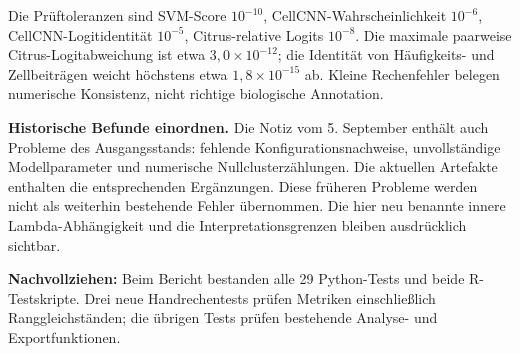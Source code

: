 \documentclass[11pt,a4paper]{article}
\newcommand{\source}[1]{\par{\footnotesize\raggedright\color{muted}\textbf{Nachvollziehen:} #1\par}}
\begin{document}
Die Prüftoleranzen sind SVM-Score \(10^{-10}\), CellCNN-Wahrscheinlichkeit
\(10^{-6}\), CellCNN-Logitidentität \(10^{-5}\), Citrus-relative Logits
\(10^{-8}\). Die maximale paarweise Citrus-Logitabweichung ist etwa
\(3{,}0\times10^{-12}\); die Identität von Häufigkeits- und Zellbeiträgen
weicht höchstens etwa \(1{,}8\times10^{-15}\) ab. Kleine Rechenfehler
belegen numerische Konsistenz, nicht richtige biologische Annotation.

\textbf{Historische Befunde einordnen.} Die Notiz vom 5. September enthält
auch Probleme des Ausgangsstands: fehlende Konfigurationsnachweise,
unvollständige Modellparameter und numerische Nullclusterzählungen.
Die aktuellen Artefakte enthalten die entsprechenden Ergänzungen.
Diese früheren Probleme werden nicht als weiterhin bestehende Fehler
übernommen. Die hier neu benannte innere Lambda-Abhängigkeit und die
Interpretationsgrenzen bleiben ausdrücklich sichtbar.
\source{Beim Bericht bestanden alle 29 Python-Tests und beide R-Testskripte.
Drei neue Handrechentests prüfen Metriken einschließlich Ranggleichständen;
die übrigen Tests prüfen bestehende Analyse- und Exportfunktionen.}

\clearpage
\end{document}
